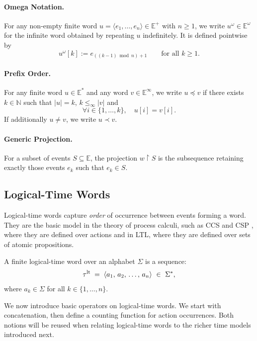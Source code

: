 \paragraph{Omega Notation.}
For any non-empty finite word \(u=\langle e_1,\dots,e_n\rangle\in\mathbb{E}^{+}\) with \(n\ge 1\), we write \(u^{\omega}\in\mathbb{E}^{\omega}\) for the infinite word obtained by repeating \(u\) indefinitely. It is defined pointwise by
\[
u^{\omega}[k] := e_{((k-1) \bmod n)+1}
\qquad\text{for all } k\ge 1.
\]
\paragraph{Prefix Order.}
For any finite word \(u \in \mathbb{E}^{*}\) and any word \(v \in \mathbb{E}^{\infty}\), we write \(u \preceq v\) if there exists \(k \in \mathbb{N}\) such that \(|u|=k\), $k\leq_\infty |v|$ and 
\[
\forall i \in \{1,\dots,k\},\quad u[i]=v[i].
\]
If additionally \(u \neq v\), we write \(u \prec v\).


\paragraph{Generic Projection.}
For a subset of events $S \subseteq \mathbb{E}$, the projection $w{\upharpoonright}S$ is the subsequence retaining exactly those events $e_k$ such that $e_k \in S$.


\subsection{Logical-Time Words}

Logical-time words capture \emph{order} of occurrence between events forming a word. They are the basic model in the theory of process calculi, such as CCS \cite{Milner89} and CSP \cite{hoare1978communicating}, where they are defined over actions and in LTL, where they are defined over sets of atomic propositions. 

\begin{definition}
  A finite logical-time word over an alphabet \(\Sigma\) is a sequence:
  \[
  \tau^{\mathrm{lt}}\;=\; \langle a_1,\, a_2,\,\dots,\,a_{n} \rangle \ \in\ \Sigma^{*},
  \]
  where \(a_k\in\Sigma\) for all \(k\in\{1,\dots,n\}\).
\end{definition}

We now introduce basic operators on logical-time words. We start with concatenation, then define a counting function for action occurrences. Both notions will be reused when relating logical-time words to the richer time models introduced next.


